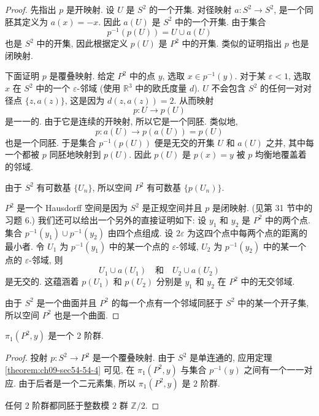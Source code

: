 \begin{proof}
先指出 $p$ 是开映射. 设 $U$ 是 $S^{2}$ 的一个开集. 对径映射 $a\colon S^{2}\to S^{2}$, 是一个同胚其定义为 $a(x)=-x$. 因此 $a(U)$ 是 $S^{2}$ 中的一个开集. 由于集合
\[
p^{-1}(p(U))=U\cup a(U)
\]
也是 $S^{2}$ 中的开集, 因此根据定义 $p(U)$ 是 $P^{2}$ 中的开集. 类似的证明指出 $p$ 也是闭映射.

下面证明 $p$ 是覆叠映射. 给定 $P^{2}$ 中的点 $y$, 选取 $x\in p^{-1}(y)$. 对于某 $\varepsilon<1$, 选取 $x$ 在 $S^{2}$ 中的一个 $\varepsilon$-邻域 (使用 $\mathbb{R}^{3}$ 中的欧氏度量 $d$). $U$ 不会包含 $S^{2}$ 的任何一对对径点 $\{z,a(z)\}$, 这是因为 $d(z,a(z))=2$. 从而映射
\[
p\colon U\longrightarrow p(U)
\]
是一一的. 由于它是连续的开映射, 所以它是一个同胚. 类似地,
\[
p\colon a(U)\longrightarrow p(a(U))=p(U)
\]
也是一个同胚. 于是集合 $p^{-1}(p(U))$ 便是无交的开集 $U$ 和 $a(U)$ 之并, 其中每一个都被 $p$ 同胚地映射到 $p(U)$. 因此 $p(U)$ 是 $p(x)=y$ 被 $p$ 均衡地覆盖着的邻域.

由于 $S^{2}$ 有可数基 $\{U_n\}$, 所以空间 $P^{2}$ 有可数基 $\{p(U_n)\}$.

$P^{2}$ 是一个 Hausdorff 空间是因为 $S^{2}$ 是正规空间并且 $p$ 是闭映射. (见第 31 节中的习题 6.) 我们还可以给出一个另外的直接证明如下: 设 $y_1$ 和 $y_2$ 是 $P^{2}$ 中的两个点. 集合 $p^{-1}(y_1)\cup p^{-1}(y_2)$ 由四个点组成. 设 $2\varepsilon$ 为这四个点中每两个点的距离的最小者. 令 $U_1$ 为 $p^{-1}(y_1)$ 中的某一个点的 $\varepsilon$-邻域, $U_2$ 为 $p^{-1}(y_2)$ 中的某一个点的 $\varepsilon$-邻域, 则
\[
U_{1}\cup a(U_{1})\quad\text{和}\quad U_{2}\cup a(U_{2})
\]
是无交的. 这蕴涵着 $p(U_1)$ 和 $p(U_2)$ 分别是 $y_1$ 和 $y_2$ 在 $P^{2}$ 中的无交邻域.

由于 $S^{2}$ 是一个曲面并且 $P^{2}$ 的每一个点有一个邻域同胚于 $S^{2}$ 中的某一个开子集, 所以空间 $P^{2}$ 也是一个曲面.
\end{proof}

\begin{corollary}
\label{corollary:ch09-sec60-60-4}
$\pi_1(P^{2},y)$ 是一个 $2$ 阶群.
\end{corollary}

\begin{proof}
投射 $p\colon S^{2}\to P^{2}$ 是一个覆叠映射. 由于 $S^{2}$ 是单连通的, 应用定理 \cref{theorem:ch09-sec54-54-4} 可见, 在 $\pi_1(P^{2},y)$ 与集合 $p^{-1}(y)$ 之间有一个一一对应. 由于后者是一个二元素集, 所以 $\pi_1(P^{2},y)$ 是 $2$ 阶群.

任何 $2$ 阶群都同胚于整数模 $2$ 群 $\mathbb{Z}/2$.
\end{proof}

